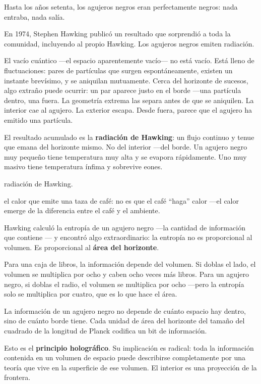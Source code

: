 \noindent Hasta los años setenta, los agujeros negros eran perfectamente negros: nada entraba, nada salía.

En 1974, Stephen Hawking publicó un resultado que sorprendió a toda la comunidad, incluyendo al propio Hawking. Los agujeros negros emiten radiación.

El vacío cuántico —el espacio aparentemente vacío— no está vacío. Está lleno de fluctuaciones: pares de partículas que surgen espontáneamente, existen un instante brevísimo, y se aniquilan mutuamente. Cerca del horizonte de sucesos, algo extraño puede ocurrir: un par aparece justo en el borde —una partícula dentro, una fuera. La geometría extrema las separa antes de que se aniquilen. La interior cae al agujero. La exterior escapa. Desde fuera, parece que el agujero ha emitido una partícula.

El resultado acumulado es la \textbf{radiación de Hawking}: un flujo continuo y tenue que emana del horizonte mismo. No del interior —del borde. Un agujero negro muy pequeño tiene temperatura muy alta y se evapora rápidamente. Uno muy masivo tiene temperatura ínfima y sobrevive eones.

\begin{fisica}
 radiación de Hawking.

 el calor que emite una taza de café: no es que el café “haga” calor —el calor emerge de la diferencia entre el café y el ambiente.
\end{fisica}
\noindent Hawking calculó la entropía de un agujero negro —la cantidad de información que contiene — y encontró algo extraordinario: la entropía no es proporcional al volumen. Es proporcional al \textbf{área del horizonte}.

Para una caja de libros, la información depende del volumen. Si doblas el lado, el volumen se multiplica por ocho y caben ocho veces más libros. Para un agujero negro, si doblas el radio, el volumen se multiplica por ocho —pero la entropía solo se multiplica por cuatro, que es lo que hace el área.

La información de un agujero negro no depende de cuánto espacio hay dentro, sino de cuánto borde tiene. Cada unidad de área del horizonte del tamaño del cuadrado de la longitud de Planck codifica un bit de información.

Esto es el \textbf{principio holográfico}. Su implicación es radical: toda la información contenida en un volumen de espacio puede describirse completamente por una teoría que vive en la superficie de ese volumen. El interior es una proyección de la frontera.

